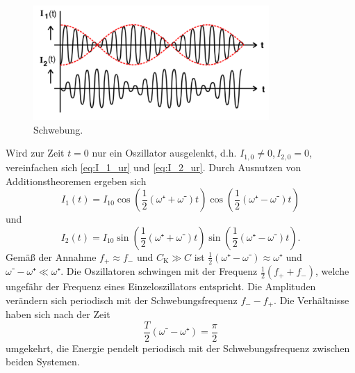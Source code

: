 \begin{figure}[h]
	\centering
	\includegraphics[width=0.8\textwidth]{Bilder/Schwebung.pdf}
		\caption{Schwebung. \cite{v355}}
		\label{fig:schwebung}
\end{figure}

Wird zur Zeit $t=0$ nur ein Oszillator ausgelenkt, d.h. $I_{1,0}\neq0$,\,$I_{2,0}=0$, vereinfachen sich \eqref{eq:I_1_ur} und \eqref{eq:I_2_ur}. 
Durch Ausnutzen von Additionstheoremen ergeben sich
\begin{equation}
	I_1(t)=I_{10}\cos(\frac{1}{2}(\omega⁺+\omega⁻)t)\cos(\frac{1}{2}(\omega⁺-\omega⁻)t)
\end{equation}
und
\begin{equation}
	I_2(t)=I_{10}\sin(\frac{1}{2}(\omega⁺+\omega⁻)t)\sin(\frac{1}{2}(\omega⁺-\omega⁻)t).
\end{equation}
Gemäß der Annahme $f_+\approx f_-$ und $C_\mathup{K}\gg C$ ist $\frac{1}{2}(\omega⁺-\omega⁻)\approx\omega⁺$ und $\omega⁻-\omega⁺\ll\omega⁺$.
Die Oszillatoren schwingen mit der Frequenz $\frac{1}{2}(f_+ + f_-)$, welche ungefähr der Frequenz eines Einzeloszillators entspricht. 
Die Amplituden verändern sich periodisch mit der Schwebungsfrequenz $f_- - f_+$. 
Die Verhältnisse haben sich nach der Zeit 
\begin{equation}
\frac{T}{2}({\omega⁻-\omega⁺})=\frac{\pi}{2}
\end{equation}
 umgekehrt, die Energie pendelt periodisch mit der Schwebungsfrequenz zwischen beiden Systemen.

\newpage
